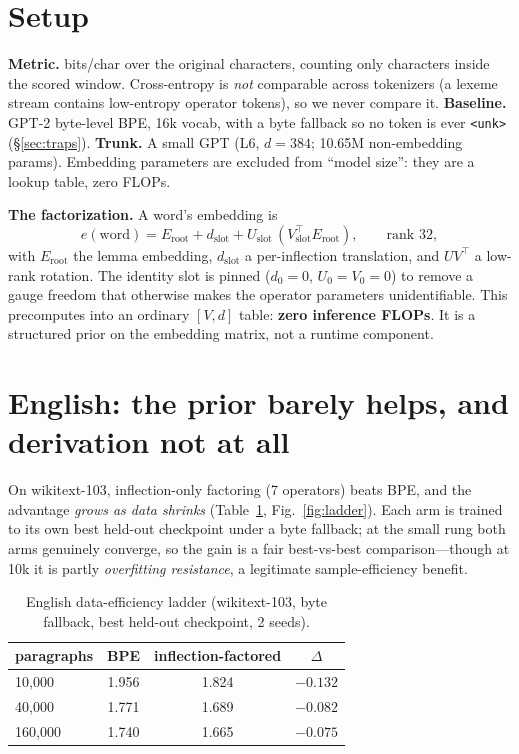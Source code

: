 \documentclass[11pt]{article}
\newcommand{\bc}{bits/char}
\begin{document}
\section{Setup}
\textbf{Metric.} \bc{} over the original characters, counting only characters inside the
scored window. Cross-entropy is \emph{not} comparable across tokenizers (a lexeme stream
contains low-entropy operator tokens), so we never compare it.
\textbf{Baseline.} GPT-2 byte-level BPE, 16k vocab, with a byte fallback so no token is ever
\texttt{<unk>} (\S\ref{sec:traps}). \textbf{Trunk.} A small GPT (L6, $d{=}384$; 10.65M
non-embedding params). Embedding parameters are excluded from ``model size'': they are a
lookup table, zero FLOPs.

\smallskip\noindent\textbf{The factorization.} A word's embedding is
\begin{equation}
e(\text{word}) = E_{\text{root}} + d_{\text{slot}} + U_{\text{slot}}\,(V_{\text{slot}}^{\top} E_{\text{root}}),
\qquad \text{rank } 32,
\end{equation}
with $E_{\text{root}}$ the lemma embedding, $d_{\text{slot}}$ a per-inflection translation,
and $U V^{\top}$ a low-rank rotation. The identity slot is pinned
($d_0{=}0,\,U_0{=}V_0{=}0$) to remove a gauge freedom that otherwise makes the operator
parameters unidentifiable. This precomputes into an ordinary $[V,d]$ table: \textbf{zero
inference FLOPs}. It is a structured prior on the embedding matrix, not a runtime component.

\section{English: the prior barely helps, and derivation not at all}
On wikitext-103, inflection-only factoring (7 operators) beats BPE, and the advantage
\emph{grows as data shrinks} (Table~\ref{tab:ladder}, Fig.~\ref{fig:ladder}). Each arm is
trained to its own best held-out checkpoint under a byte fallback; at the small rung both
arms genuinely converge, so the gain is a fair best-vs-best comparison---though at 10k it is
partly \emph{overfitting resistance}, a legitimate sample-efficiency benefit.

\begin{table}[h]\centering
\caption{English data-efficiency ladder (wikitext-103, byte fallback, best held-out checkpoint, 2 seeds).}
\label{tab:ladder}
\begin{tabular}{lccc}
\toprule
paragraphs & BPE & inflection-factored & $\Delta$ \\
\midrule
10{,}000  & 1.956 & 1.824 & $-0.132$ \\
40{,}000  & 1.771 & 1.689 & $-0.082$ \\
160{,}000 & 1.740 & 1.665 & $-0.075$ \\
\bottomrule
\end{tabular}
\end{table}
\end{document}
